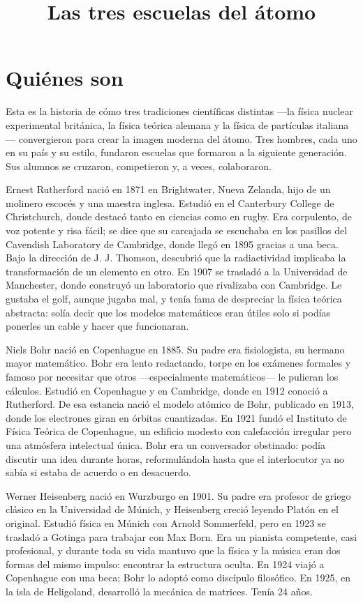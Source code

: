 \documentclass[11pt,a4paper]{article}
\title{Las tres escuelas del átomo}
\author{}
\date{}
\begin{document}
\maketitle

\section*{Quiénes son}

Esta es la historia de cómo tres tradiciones científicas distintas ---la física nuclear experimental británica, la física teórica alemana y la física de partículas italiana--- convergieron para crear la imagen moderna del átomo. Tres hombres, cada uno en su país y su estilo, fundaron escuelas que formaron a la siguiente generación. Sus alumnos se cruzaron, competieron y, a veces, colaboraron.

Ernest Rutherford nació en 1871 en Brightwater, Nueva Zelanda, hijo de un molinero escocés y una maestra inglesa. Estudió en el Canterbury College de Christchurch, donde destacó tanto en ciencias como en rugby. Era corpulento, de voz potente y risa fácil; se dice que su carcajada se escuchaba en los pasillos del Cavendish Laboratory de Cambridge, donde llegó en 1895 gracias a una beca. Bajo la dirección de J. J. Thomson, descubrió que la radiactividad implicaba la transformación de un elemento en otro. En 1907 se trasladó a la Universidad de Manchester, donde construyó un laboratorio que rivalizaba con Cambridge. Le gustaba el golf, aunque jugaba mal, y tenía fama de despreciar la física teórica abstracta: solía decir que los modelos matemáticos eran útiles solo si podías ponerles un cable y hacer que funcionaran.

Niels Bohr nació en Copenhague en 1885. Su padre era fisiologista, su hermano mayor matemático. Bohr era lento redactando, torpe en los exámenes formales y famoso por necesitar que otros ---especialmente matemáticos--- le pulieran los cálculos. Estudió en Copenhague y en Cambridge, donde en 1912 conoció a Rutherford. De esa estancia nació el modelo atómico de Bohr, publicado en 1913, donde los electrones giran en órbitas cuantizadas. En 1921 fundó el Instituto de Física Teórica de Copenhague, un edificio modesto con calefacción irregular pero una atmósfera intelectual única. Bohr era un conversador obstinado: podía discutir una idea durante horas, reformulándola hasta que el interlocutor ya no sabía si estaba de acuerdo o en desacuerdo.

Werner Heisenberg nació en Wurzburgo en 1901. Su padre era profesor de griego clásico en la Universidad de Múnich, y Heisenberg creció leyendo Platón en el original. Estudió física en Múnich con Arnold Sommerfeld, pero en 1923 se trasladó a Gotinga para trabajar con Max Born. Era un pianista competente, casi profesional, y durante toda su vida mantuvo que la física y la música eran dos formas del mismo impulso: encontrar la estructura oculta. En 1924 viajó a Copenhague con una beca; Bohr lo adoptó como discípulo filosófico. En 1925, en la isla de Heligoland, desarrolló la mecánica de matrices. Tenía 24 años.
\end{document}
